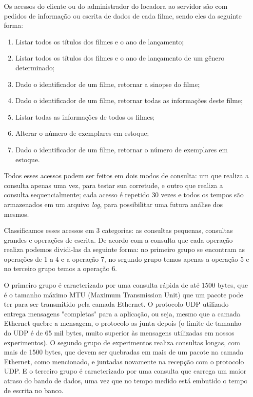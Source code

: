 \documentclass[12pt,a4paper]{article}
\newenvironment{myenumerate}{
\begin{enumerate}
 \setlength{\itemsep}{1pt}
 \setlength{\parskip}{0pt}
 \setlength{\parsep}{0pt}
}{\end{enumerate}}
\begin{document}
Os acessos do cliente ou do administrador do locadora ao servidor são com pedidos de informação ou escrita de dados de cada filme, sendo eles da seguinte forma:

\begin {myenumerate}
\item Listar todos os títulos dos filmes e o ano de lançamento;
\item Listar todos os títulos dos filmes e o ano de lançamento de um gênero determinado;
\item Dado o identificador de um filme, retornar a sinopse do filme;
\item Dado o identificador de um filme, retornar todas as informações deste filme;
\item Listar todas as informações de todos os filmes;
\item Alterar o número de exemplares em estoque;
\item Dado o identificador de um filme, retornar o número de exemplares
em estoque.
\end{myenumerate}

    Todos esses acessos podem ser feitos em dois modos de consulta: um que realiza a consulta apenas uma vez, para testar sua corretude, e outro que realiza a consulta sequencialmente; cada acesso é repetido 30 vezes e todos os tempos são armazenados em um arquivo {\it log}, para possibilitar uma futura análise dos mesmos.
    
    Classificamos esses acessos em 3 categorias: as consultas pequenas, consultas grandes e operações de escrita. De acordo com a consulta que cada operação realiza podemos dividi-las da seguinte forma: no primeiro grupo se encontram as operações de 1 a 4 e a operação 7, no segundo grupo temos apenas a operação 5 e no terceiro grupo temos a operação 6. 
    
O primeiro grupo é caracterizado por uma consulta rápida de até 1500 bytes, que é o tamanho máximo MTU (Maximum Transmission Unit) que um pacote pode ter para ser transmitido pela camada Ethernet. O protocolo UDP utilizado entrega mensagens "completas" para a aplicação, ou seja, mesmo que a camada Ethernet quebre a mensagem, o protocolo as junta depois (o limite de tamanho do UDP é de 65 mil bytes, muito superior às mensagens utilizadas em nossos experimentos). O segundo grupo de experimentos realiza consultas longas, com mais de 1500 bytes, que devem ser quebradas em mais de um pacote na camada Ethernet, como mencionado, e juntadas novamente na recepção com o protocolo UDP. E o terceiro grupo é caracterizado por uma consulta que carrega um maior atraso do bando de dados, uma vez que no tempo medido está embutido o tempo de escrita no banco.
\end{document}
